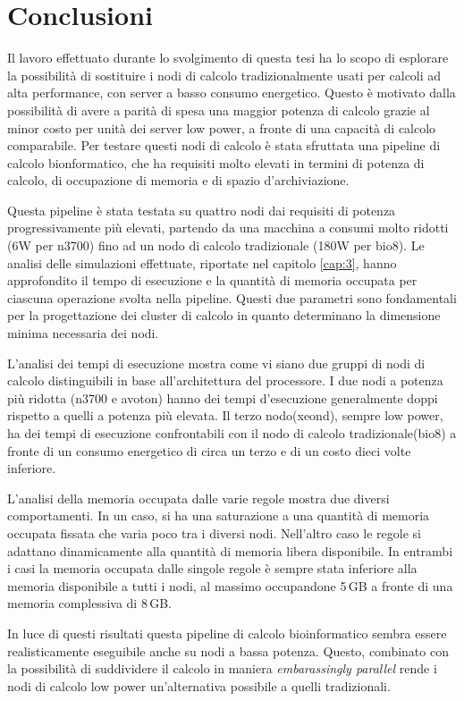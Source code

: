 \chapter{Conclusioni}
Il lavoro effettuato durante lo svolgimento di questa tesi ha lo scopo di esplorare la possibilità di sostituire i nodi di calcolo tradizionalmente usati per calcoli ad alta performance, con server a basso consumo energetico.
Questo è motivato dalla possibilità di avere a parità di spesa una maggior potenza di calcolo grazie al minor costo per unità dei server low power, a fronte di una capacità di calcolo comparabile.
Per testare questi nodi di calcolo è stata sfruttata una pipeline di calcolo bionformatico, che ha requisiti molto elevati in termini di potenza di calcolo, di occupazione di memoria e di spazio d'archiviazione.

Questa pipeline è stata testata su quattro nodi dai requisiti di potenza progressivamente più elevati, partendo da una macchina a consumi molto ridotti (6W per n3700) fino ad un nodo di calcolo tradizionale (180W per bio8).
Le analisi delle simulazioni effettuate, riportate nel capitolo \ref{cap:3}, hanno approfondito il tempo di esecuzione e la quantità di memoria occupata per ciascuna operazione svolta nella pipeline.
Questi due parametri sono fondamentali per la progettazione dei cluster di calcolo in quanto determinano la dimensione minima necessaria dei nodi.

L'analisi dei tempi di esecuzione mostra come vi siano due gruppi di nodi di calcolo distinguibili in base all'architettura del processore.
I due nodi a potenza più ridotta (n3700 e avoton) hanno dei tempi d'esecuzione generalmente doppi rispetto a quelli a potenza più elevata.
Il terzo nodo(xeond), sempre low power, ha dei tempi di esecuzione confrontabili con il nodo di calcolo tradizionale(bio8) a fronte di un consumo energetico di circa un terzo e di un costo dieci volte inferiore.

L'analisi della memoria occupata dalle varie regole mostra due diversi comportamenti.
In un caso, si ha una saturazione a una quantità di memoria occupata fissata che varia poco tra i diversi nodi.
Nell'altro caso le regole si adattano dinamicamente alla quantità di memoria libera disponibile.
In entrambi i casi la memoria occupata dalle singole regole è sempre stata inferiore alla memoria disponibile a tutti i nodi, al massimo occupandone 5\,GB a fronte di una memoria complessiva di 8\,GB.

In luce di questi risultati questa pipeline di calcolo bioinformatico sembra essere realisticamente eseguibile anche su nodi a bassa potenza.
Questo, combinato con la possibilità di suddividere il calcolo in maniera \textit{embarassingly parallel} rende i nodi di calcolo low power un'alternativa possibile a quelli tradizionali. 

